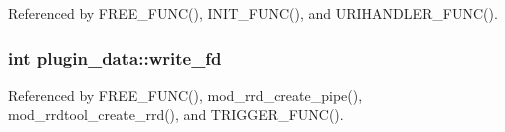 Referenced by F\-R\-E\-E\-\_\-\-F\-U\-N\-C(), I\-N\-I\-T\-\_\-\-F\-U\-N\-C(), and U\-R\-I\-H\-A\-N\-D\-L\-E\-R\-\_\-\-F\-U\-N\-C().

\hypertarget{structplugin__data_a5796c6a6531414a158da4b2f56c5e89e}{
\subsubsection[{write\-\_\-fd}]{\setlength{\rightskip}{0pt plus 5cm}int plugin\-\_\-data\-::write\-\_\-fd}}\label{structplugin__data_a5796c6a6531414a158da4b2f56c5e89e}


Referenced by F\-R\-E\-E\-\_\-\-F\-U\-N\-C(), mod\-\_\-rrd\-\_\-create\-\_\-pipe(), mod\-\_\-rrdtool\-\_\-create\-\_\-rrd(), and T\-R\-I\-G\-G\-E\-R\-\_\-\-F\-U\-N\-C().




